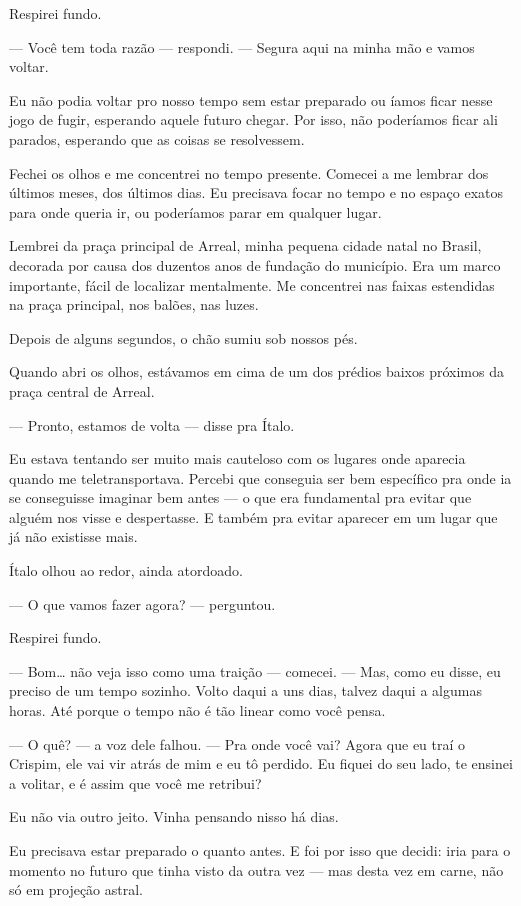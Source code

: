 Respirei fundo.

— Você tem toda razão — respondi. — Segura aqui na minha mão e vamos voltar.

Eu não podia voltar pro nosso tempo sem estar preparado ou íamos ficar nesse jogo de fugir, esperando aquele futuro chegar.  
Por isso, não poderíamos ficar ali parados, esperando que as coisas se resolvessem.

Fechei os olhos e me concentrei no tempo presente.  
Comecei a me lembrar dos últimos meses, dos últimos dias.  
Eu precisava focar no tempo e no espaço exatos para onde queria ir, ou poderíamos parar em qualquer lugar.

Lembrei da praça principal de Arreal, minha pequena cidade natal no Brasil, decorada por causa dos duzentos anos de fundação do município.
Era um marco importante, fácil de localizar mentalmente.  
Me concentrei nas faixas estendidas na praça principal, nos balões, nas luzes.

Depois de alguns segundos, o chão sumiu sob nossos pés.

Quando abri os olhos, estávamos em cima de um dos prédios baixos próximos da praça central de Arreal.

— Pronto, estamos de volta — disse pra Ítalo.

Eu estava tentando ser muito mais cauteloso com os lugares onde aparecia quando me teletransportava.  
Percebi que conseguia ser bem específico pra onde ia se conseguisse imaginar bem antes — o que era fundamental pra evitar que alguém nos visse e despertasse.  
E também pra evitar aparecer em um lugar que já não existisse mais.

Ítalo olhou ao redor, ainda atordoado.

— O que vamos fazer agora? — perguntou.

Respirei fundo.

— Bom… não veja isso como uma traição — comecei. — Mas, como eu disse, eu preciso de um tempo sozinho.  
Volto daqui a uns dias, talvez daqui a algumas horas.  
Até porque o tempo não é tão linear como você pensa.

— O quê? — a voz dele falhou. — Pra onde você vai?  
Agora que eu traí o Crispim, ele vai vir atrás de mim e eu tô perdido.  
Eu fiquei do seu lado, te ensinei a volitar, e é assim que você me retribui?

Eu não via outro jeito.  
Vinha pensando nisso há dias.

Eu precisava estar preparado o quanto antes.  
E foi por isso que decidi: iria para o momento no futuro que tinha visto da outra vez — mas desta vez em carne, não só em projeção astral.


